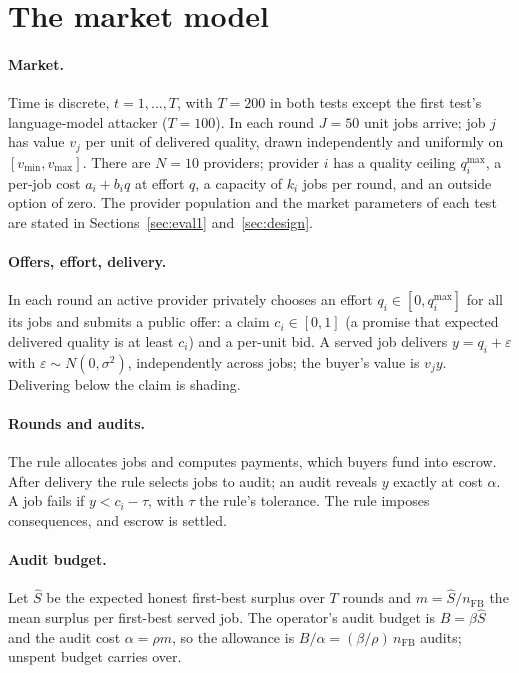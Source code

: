 \documentclass[11pt]{article}
\begin{document}
\section{The market model}\label{sec:model}
\paragraph{Market.} Time is discrete, $t = 1, \dots, T$, with $T = 200$ in both tests except the first test's language-model attacker ($T = 100$). In each round $J = 50$ unit jobs arrive; job $j$ has value $v_j$ per unit of delivered quality, drawn independently and uniformly on $[v_{\min}, v_{\max}]$. There are $N = 10$ providers; provider $i$ has a quality ceiling $q^{\max}_i$, a per-job cost $a_i + b_i q$ at effort $q$, a capacity of $k_i$ jobs per round, and an outside option of zero. The provider population and the market parameters of each test are stated in Sections~\ref{sec:eval1} and~\ref{sec:design}.

\paragraph{Offers, effort, delivery.} In each round an active provider privately chooses an effort $q_i \in [0, q^{\max}_i]$ for all its jobs and submits a public offer: a claim $c_i \in [0,1]$ (a promise that expected delivered quality is at least $c_i$) and a per-unit bid. A served job delivers $y = q_i + \varepsilon$ with $\varepsilon \sim N(0,\sigma^2)$, independently across jobs; the buyer's value is $v_j y$. Delivering below the claim is shading.

\paragraph{Rounds and audits.} The rule allocates jobs and computes payments, which buyers fund into escrow. After delivery the rule selects jobs to audit; an audit reveals $y$ exactly at cost $\alpha$. A job fails if $y < c_i - \tau$, with $\tau$ the rule's tolerance. The rule imposes consequences, and escrow is settled.

\paragraph{Audit budget.} Let $\hat S$ be the expected honest first-best surplus over $T$ rounds and $m = \hat S / n_{\mathrm{FB}}$ the mean surplus per first-best served job. The operator's audit budget is $B = \beta \hat S$ and the audit cost $\alpha = \rho m$, so the allowance is $B/\alpha = (\beta/\rho)\, n_{\mathrm{FB}}$ audits; unspent budget carries over.
\end{document}
